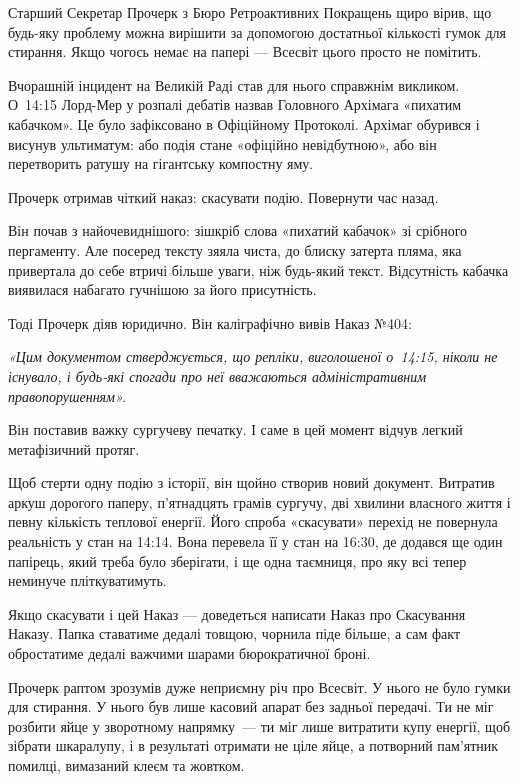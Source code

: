 \documentclass[12pt, a4paper, openany]{book}
\begin{document}
\begin{terrybox}
Старший Секретар Прочерк з Бюро Ретроактивних Покращень щиро вірив, що будь-яку проблему можна вирішити за допомогою достатньої кількості гумок для стирання. Якщо чогось немає на папері --- Всесвіт цього просто не помітить.

Вчорашній інцидент на Великій Раді став для нього справжнім викликом. О~14:15 Лорд-Мер у розпалі дебатів назвав Головного Архімага «пихатим кабачком». Це було зафіксовано в Офіційному Протоколі. Архімаг обурився і висунув ультиматум: або подія стане «офіційно невідбутною», або він перетворить ратушу на гігантську компостну яму.

Прочерк отримав чіткий наказ: скасувати подію. Повернути час назад.

Він почав з найочевиднішого: зішкріб слова «пихатий кабачок» зі срібного пергаменту. Але посеред тексту зяяла чиста, до блиску затерта пляма, яка привертала до себе втричі більше уваги, ніж будь-який текст. Відсутність кабачка виявилася набагато гучнішою за його присутність.

Тоді Прочерк діяв юридично. Він каліграфічно вивів Наказ №404:

\medskip
\textit{«Цим документом стверджується, що репліки, виголошеної о~14:15, ніколи не існувало, і будь-які спогади про неї вважаються адміністративним правопорушенням».}

\medskip
Він поставив важку сургучеву печатку. І саме в цей момент відчув легкий метафізичний протяг.

Щоб стерти одну подію з історії, він щойно створив новий документ. Витратив аркуш дорогого паперу, п'ятнадцять грамів сургучу, дві хвилини власного життя і певну кількість теплової енергії. Його спроба «скасувати» перехід не повернула реальність у стан на 14:14. Вона перевела її у стан на 16:30, де додався ще один папірець, який треба було зберігати, і ще одна таємниця, про яку всі тепер неминуче пліткуватимуть.

Якщо скасувати і цей Наказ --- доведеться написати Наказ про Скасування Наказу. Папка ставатиме дедалі товщою, чорнила піде більше, а сам факт обростатиме дедалі важчими шарами бюрократичної броні.

Прочерк раптом зрозумів дуже неприємну річ про Всесвіт. У нього не було гумки для стирання. У нього був лише касовий апарат без задньої передачі. Ти не міг розбити яйце у зворотному напрямку~--- ти міг лише витратити купу енергії, щоб зібрати шкаралупу, і в результаті отримати не ціле яйце, а потворний пам'ятник помилці, вимазаний клеєм та жовтком.


\end{terrybox}
\end{document}

